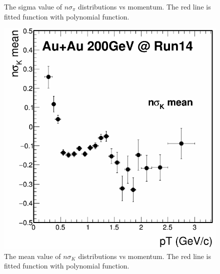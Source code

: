 \begin{figure}[htbp]
\begin{minipage}[htbp]{0.5\linewidth}
\caption{The sigma value of $n\sigma_{\pi}$ distributions vs momentum. The red line is fitted function with polynomial function. \label{fig:pionsigma}}
\end{minipage}
\end{figure}

\begin{figure}[htbp]
\begin{minipage}[htbp]{0.5\linewidth}
\centering
\includegraphics[width=1.0\textwidth]{figure/Run14_D0HFT/nSigKaon_mean.png}
\caption{The mean value of $n\sigma_{K}$ distributions vs momentum. The red line is fitted function with polynomial function. \label{fig:kaonmean}}
\end{minipage}
\hfill
\begin{minipage}[htbp]{0.5\linewidth}
\centering

\end{minipage}
\end{figure}
